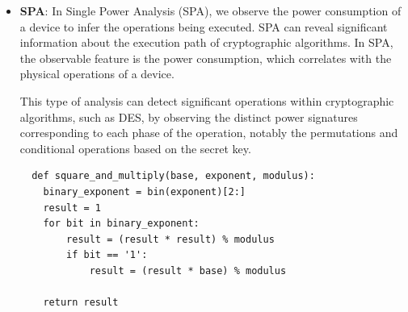 \begin{itemize}
  \item \textbf{SPA}: In Single Power Analysis (SPA), we observe the power consumption of a device to infer the operations being executed. SPA can reveal significant information about the execution path of cryptographic algorithms.
  In SPA, the observable feature is the power consumption, which correlates with the physical operations of a device. 

  This type of analysis can detect significant operations within cryptographic algorithms, such as DES, by observing the distinct power signatures corresponding to each phase of the operation, notably the permutations and conditional operations based on the secret key.

  \begin{verbatim}
  def square_and_multiply(base, exponent, modulus):
    binary_exponent = bin(exponent)[2:]
    result = 1
    for bit in binary_exponent:
        result = (result * result) % modulus
        if bit == '1':
            result = (result * base) % modulus
    
    return result
  \end{verbatim}
\end{itemize}

